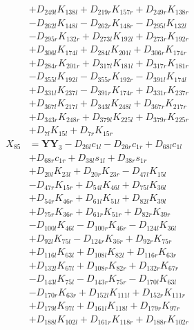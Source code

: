\begin{multicols}{2}
\begin{align}
&+ D_{249l}K_{138l} + D_{219r}K_{157r} + D_{249r}K_{138r}  \nonumber \\
&- D_{262l}K_{148l} - D_{262r}K_{148r} - D_{295l}K_{132l}  \nonumber \\
&- D_{295r}K_{132r} + D_{273l}K_{192l} + D_{273r}K_{192r}  \nonumber \\
&+ D_{306l}K_{174l} + D_{284l}K_{201l} + D_{306r}K_{174r}  \nonumber \\
&+ D_{284r}K_{201r} + D_{317l}K_{181l} + D_{317r}K_{181r}  \nonumber \\
&- D_{355l}K_{192l} - D_{355r}K_{192r} - D_{391l}K_{174l}  \nonumber \\
&+ D_{331l}K_{237l} - D_{391r}K_{174r} + D_{331r}K_{237r}  \nonumber \\
&+ D_{367l}K_{217l} + D_{343l}K_{248l} + D_{367r}K_{217r}  \nonumber \\
&+ D_{343r}K_{248r} + D_{379l}K_{225l} + D_{379r}K_{225r}  \nonumber \\
&+ D_{7l}K_{15l} + D_{7r}K_{15r} \nonumber \\
X_{85} &= \mathbf{YY}_3 - D_{26l}c_{1l} - D_{26r}c_{1r} + D_{68l}c_{1l}  \nonumber \\
&+ D_{68r}c_{1r} + D_{38l}s_{1l} + D_{38r}s_{1r}  \nonumber \\
&+ D_{20l}K_{23l} + D_{20r}K_{23r} - D_{47l}K_{15l}  \nonumber \\
&- D_{47r}K_{15r} + D_{54l}K_{46l} + D_{75l}K_{36l}  \nonumber \\
&+ D_{54r}K_{46r} + D_{61l}K_{51l} + D_{82l}K_{39l}  \nonumber \\
&+ D_{75r}K_{36r} + D_{61r}K_{51r} + D_{82r}K_{39r}  \nonumber \\
&- D_{100l}K_{46l} - D_{100r}K_{46r} - D_{124l}K_{36l}  \nonumber \\
&+ D_{92l}K_{75l} - D_{124r}K_{36r} + D_{92r}K_{75r}  \nonumber \\
&+ D_{116l}K_{63l} + D_{108l}K_{82l} + D_{116r}K_{63r}  \nonumber \\
&+ D_{132l}K_{67l} + D_{108r}K_{82r} + D_{132r}K_{67r}  \nonumber \\
&- D_{143l}K_{75l} - D_{143r}K_{75r} - D_{170l}K_{63l}  \nonumber \\
&- D_{170r}K_{63r} + D_{152l}K_{111l} + D_{152r}K_{111r}  \nonumber \\
&+ D_{179l}K_{97l} + D_{161l}K_{118l} + D_{179r}K_{97r}  \nonumber \\
&+ D_{188l}K_{102l} + D_{161r}K_{118r} + D_{188r}K_{102r}  \nonumber \\

\end{align}
\end{multicols}
